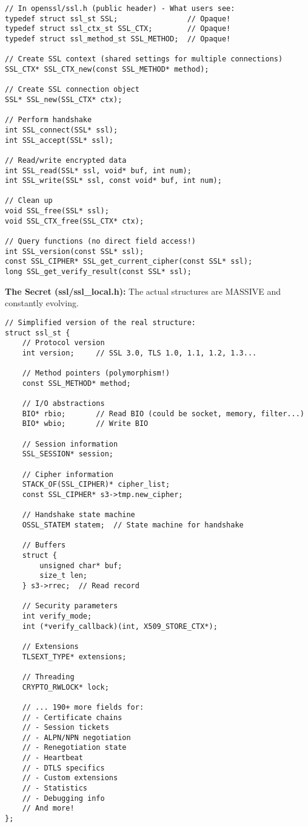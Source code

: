 \begin{lstlisting}
// In openssl/ssl.h (public header) - What users see:
typedef struct ssl_st SSL;                // Opaque!
typedef struct ssl_ctx_st SSL_CTX;        // Opaque!
typedef struct ssl_method_st SSL_METHOD;  // Opaque!

// Create SSL context (shared settings for multiple connections)
SSL_CTX* SSL_CTX_new(const SSL_METHOD* method);

// Create SSL connection object
SSL* SSL_new(SSL_CTX* ctx);

// Perform handshake
int SSL_connect(SSL* ssl);
int SSL_accept(SSL* ssl);

// Read/write encrypted data
int SSL_read(SSL* ssl, void* buf, int num);
int SSL_write(SSL* ssl, const void* buf, int num);

// Clean up
void SSL_free(SSL* ssl);
void SSL_CTX_free(SSL_CTX* ctx);

// Query functions (no direct field access!)
int SSL_version(const SSL* ssl);
const SSL_CIPHER* SSL_get_current_cipher(const SSL* ssl);
long SSL_get_verify_result(const SSL* ssl);
\end{lstlisting}

\textbf{The Secret (ssl/ssl\_local.h):} The actual structures are MASSIVE and constantly evolving.

\begin{lstlisting}
// Simplified version of the real structure:
struct ssl_st {
    // Protocol version
    int version;     // SSL 3.0, TLS 1.0, 1.1, 1.2, 1.3...

    // Method pointers (polymorphism!)
    const SSL_METHOD* method;

    // I/O abstractions
    BIO* rbio;       // Read BIO (could be socket, memory, filter...)
    BIO* wbio;       // Write BIO

    // Session information
    SSL_SESSION* session;

    // Cipher information
    STACK_OF(SSL_CIPHER)* cipher_list;
    const SSL_CIPHER* s3->tmp.new_cipher;

    // Handshake state machine
    OSSL_STATEM statem;  // State machine for handshake

    // Buffers
    struct {
        unsigned char* buf;
        size_t len;
    } s3->rrec;  // Read record

    // Security parameters
    int verify_mode;
    int (*verify_callback)(int, X509_STORE_CTX*);

    // Extensions
    TLSEXT_TYPE* extensions;

    // Threading
    CRYPTO_RWLOCK* lock;

    // ... 190+ more fields for:
    // - Certificate chains
    // - Session tickets
    // - ALPN/NPN negotiation
    // - Renegotiation state
    // - Heartbeat
    // - DTLS specifics
    // - Custom extensions
    // - Statistics
    // - Debugging info
    // And more!
};
\end{lstlisting}

